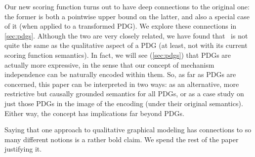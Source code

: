 {{%
    Our new scoring function turns out to have deep
connections to the original
one:
the former is both a pointwise upper bound on the latter, 
and also a special case of it (when applied to a transformed PDG).
We explore these connections in \cref{sec:pdgs}. 
}%
%
%
Although the two are very closely related, we have found that \scibility\ is not quite the same as the qualitative aspect of a PDG (at least, not with its current scoring function semantics). 
In fact, we will see (\cref{sec:pdgs}) that PDGs are actually more expressive, in the sense that our concept of mechanism independence can be naturally encoded within them. 
So, as far as PDGs are concerned, this paper can be interpreted in two ways: as an alternative, more restrictive but causally grounded semantics for all PDGs, 
or as a case study on just those PDGs in the image of the encoding (under their original semantics).
Either way, the concept has implications far beyond PDGs.
%
%
}

Saying that one approach to
qualitative graphical modeling has
connections to so many different notions is a rather bold claim.  We spend the rest of the paper justifying it.

